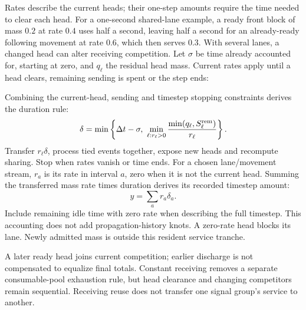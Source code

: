 \documentclass[10pt,a4paper]{article}
\newcommand{\rev}[1]{{\color{revisionred}#1}}
\begin{document}
Rates describe the current heads; their one-step amounts require the
time needed to clear each head. For a one-second shared-lane example,
a ready front block of mass $0.2$ at rate $0.4$ uses half a second,
leaving half a second for an already-ready following movement at rate
$0.6$, which then serves $0.3$. With several lanes, a changed head can
alter receiving competition. Let $\sigma$ be time already accounted for,
starting at zero, and $q_\ell$ the residual head mass. Current rates apply
until a head clears, remaining sending is spent or the step ends:
\par
\rev{Combining the current-head, sending and timestep stopping constraints derives the duration rule:}
\begin{equation}
 \delta=\min\left\{\Delta t-\sigma,\
 \min_{\ell:r_\ell>0}
       \frac{\min(q_\ell,S_\ell^{\rm rem})}{r_\ell}\right\}.
 \label{eq:head-time}
\end{equation}
Transfer $r_\ell\delta$, process tied events together, expose new heads
and recompute sharing. Stop when rates vanish or time ends.
For a chosen lane/movement stream, $r_a$ is its rate in interval $a$,
zero when it is not the current head.
\rev{Summing the transferred mass rate times duration derives its recorded timestep amount:}
\begin{equation}
 y=\sum_a r_a\delta_a.
 \label{eq:service-amount}
\end{equation}
Include remaining idle time with zero rate when describing the full
timestep. This accounting does not add propagation-history knots.
A zero-rate head blocks its lane. Newly admitted mass is outside this
resident service tranche.

A later ready head joins current competition; earlier discharge is not
compensated to equalize final totals. Constant receiving removes a
separate consumable-pool exhaustion rule, but head clearance and changing
competitors remain sequential. Receiving reuse does not transfer one
signal group's service to another.
\end{document}
